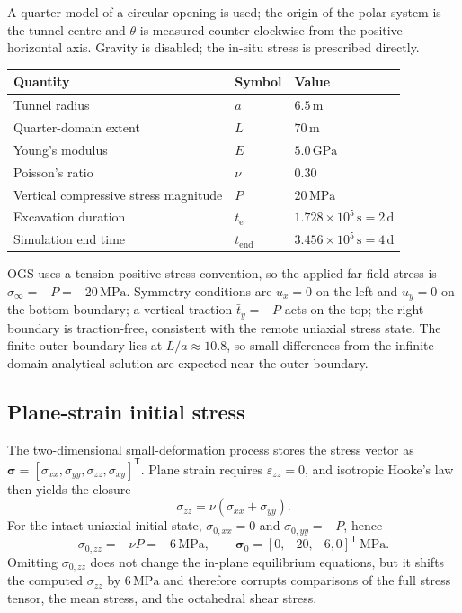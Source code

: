 \documentclass[11pt,a4paper]{tubaf-report}
\newcommand{\vect}[1]{\bm{#1}}
\newcommand{\trans}{\mathsf{T}}
\newcommand{\MPa}{\,\mathrm{MPa}}
\newcommand{\GPa}{\,\mathrm{GPa}}
\begin{document}
A quarter model of a circular opening is used; the origin of the polar system
is the tunnel centre and $\theta$ is measured counter-clockwise from the
positive horizontal axis. Gravity is disabled; the in-situ stress is
prescribed directly.

\begin{center}
\begin{tabular}{@{}lll@{}}
\toprule
Quantity & Symbol & Value \\
\midrule
Tunnel radius & $a$ & $6.5\,\mathrm{m}$ \\
Quarter-domain extent & $L$ & $70\,\mathrm{m}$ \\
Young's modulus & $E$ & $5.0\GPa$ \\
Poisson's ratio & $\nu$ & $0.30$ \\
Vertical compressive stress magnitude & $P$ & $20\MPa$ \\
Excavation duration & $t_{\mathrm e}$ & $1.728\times10^5\,\mathrm{s}=2\,\mathrm d$ \\
Simulation end time & $t_{\mathrm{end}}$ & $3.456\times10^5\,\mathrm{s}=4\,\mathrm d$ \\
\bottomrule
\end{tabular}
\end{center}

OGS uses a tension-positive stress convention, so the applied far-field
stress is $\sigma_\infty=-P=-20\MPa$. Symmetry conditions are $u_x=0$ on the
left and $u_y=0$ on the bottom boundary; a vertical traction
$\bar t_y=-P$ acts on the top; the right boundary is traction-free,
consistent with the remote uniaxial stress state. The finite outer boundary
lies at $L/a\approx10.8$, so small differences from the infinite-domain
analytical solution are expected near the outer boundary.

\subsection{Plane-strain initial stress}
\label{sec:plane-strain}

The two-dimensional small-deformation process stores the stress vector as
$\vect{\sigma}=[\sigma_{xx},\sigma_{yy},\sigma_{zz},\sigma_{xy}]^{\trans}$.
Plane strain requires $\varepsilon_{zz}=0$, and isotropic Hooke's law then
yields the closure
\begin{equation}
  \boxed{\sigma_{zz}=\nu\left(\sigma_{xx}+\sigma_{yy}\right).}
  \label{eq:plane-strain-closure}
\end{equation}
For the intact uniaxial initial state, $\sigma_{0,xx}=0$ and
$\sigma_{0,yy}=-P$, hence
\begin{equation}
  \sigma_{0,zz}=-\nu P=-6\MPa,
  \qquad
  \vect{\sigma}_0=[0,-20,-6,0]^{\trans}\MPa.
  \label{eq:initial-stress}
\end{equation}
Omitting $\sigma_{0,zz}$ does not change the in-plane equilibrium equations,
but it shifts the computed $\sigma_{zz}$ by $6\MPa$ and therefore corrupts
comparisons of the full stress tensor, the mean stress, and the octahedral
shear stress.
\end{document}
